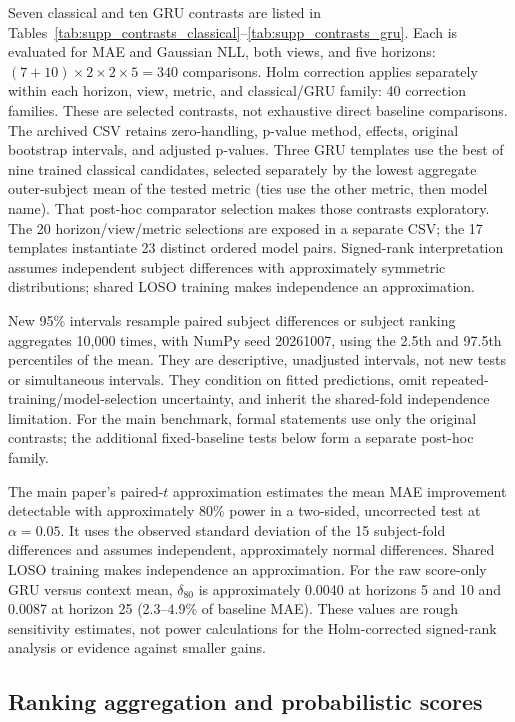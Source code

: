 \documentclass[a4paper,10pt,onecolumn]{IEEEtran}
\begin{document}
Seven classical and ten GRU contrasts are listed in
Tables~\ref{tab:supp_contrasts_classical}--\ref{tab:supp_contrasts_gru}.
Each is evaluated for MAE and Gaussian NLL, both views, and five horizons:
$(7+10)\times2\times2\times5=340$ comparisons.
Holm correction \cite{Holm1979} applies separately within each horizon,
view, metric, and classical/GRU family: 40 correction families.
These are selected contrasts, not exhaustive direct baseline comparisons.
The archived CSV retains zero-handling, p-value method, effects,
original bootstrap intervals, and adjusted p-values.
Three GRU templates use the best of nine trained classical candidates,
selected separately by the lowest aggregate outer-subject mean of the
tested metric (ties use the other metric, then model name). That
post-hoc comparator selection makes those contrasts exploratory.
The 20 horizon/view/metric selections are exposed in a separate CSV;
the 17 templates instantiate 23 distinct ordered model pairs.
Signed-rank interpretation assumes independent subject differences with
approximately symmetric distributions; shared LOSO training makes
independence an approximation.

New 95\% intervals resample paired subject differences or subject ranking
aggregates 10,000 times, with NumPy seed 20261007, using the 2.5th and 97.5th
percentiles of the mean. They are descriptive, unadjusted intervals,
not new tests or simultaneous intervals. They condition on fitted predictions,
omit repeated-training/model-selection uncertainty, and inherit the shared-fold
independence limitation. For the main benchmark, formal statements use only
the original contrasts; the additional fixed-baseline tests below form a separate
post-hoc family.

The main paper's paired-$t$ approximation estimates the mean MAE improvement
detectable with approximately 80\% power in a two-sided, uncorrected test at
$\alpha=0.05$. It uses the observed standard deviation of the 15 subject-fold
differences and assumes independent, approximately normal differences.
Shared LOSO training makes independence an approximation.
For the raw score-only GRU versus context mean, $\delta_{80}$ is approximately
0.0040 at horizons 5 and 10 and 0.0087 at horizon 25
(2.3--4.9\% of baseline MAE).
These values are rough sensitivity estimates, not power calculations for
the Holm-corrected signed-rank analysis or evidence against smaller gains.

\clearpage
\subsection{Ranking aggregation and probabilistic scores}
\end{document}
